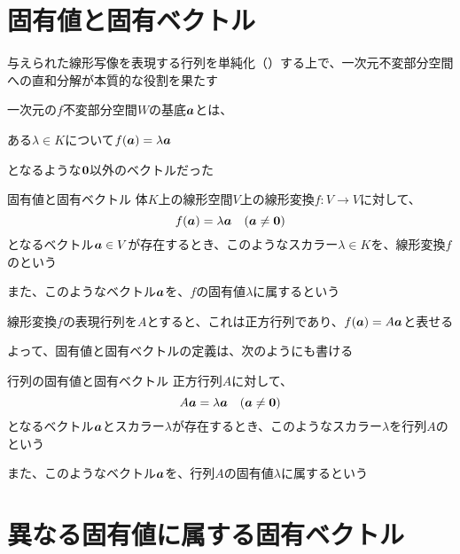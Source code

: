 \documentclass[../../../topic_linear-algebra]{subfiles}
\begin{document}
\sectionline
\section{固有値と固有ベクトル}

与えられた線形写像を表現する行列を単純化（）する上で、一次元不変部分空間への直和分解が本質的な役割を果たす

\br

一次元の$f$不変部分空間$W$の基底$\vb*{a}$とは、
\begin{shaded}
  ある$\lambda \in K$について$f(\vb*{a}) = \lambda \vb*{a}$
\end{shaded}
となるような$\vb*{0}$以外のベクトルだった

\begin{definition}{固有値と固有ベクトル}
  体$K$上の線形空間$V$上の線形変換$f\colon V \to V$に対して、
  \begin{equation*}
    f(\vb*{a}) = \lambda \vb*{a} \quad (\vb*{a} \neq \vb*{0})
  \end{equation*}
  となるベクトル$\vb*{a} \in V$が存在するとき、このようなスカラー$\lambda \in K$を、線形変換$f$のという

  また、このようなベクトル$\vb*{a}$を、$f$の固有値$\lambda$に属するという
\end{definition}

線形変換$f$の表現行列を$A$とすると、これは正方行列であり、$f(\vb*{a}) = A\vb*{a}$と表せる

よって、固有値と固有ベクトルの定義は、次のようにも書ける

\begin{definition}{行列の固有値と固有ベクトル}
  正方行列$A$に対して、
  \begin{equation*}
    A\vb*{a} = \lambda \vb*{a} \quad (\vb*{a} \neq \vb*{0})
  \end{equation*}
  となるベクトル$\vb*{a}$とスカラー$\lambda$が存在するとき、このようなスカラー$\lambda$を行列$A$のという

  また、このようなベクトル$\vb*{a}$を、行列$A$の固有値$\lambda$に属するという
\end{definition}

\sectionline
\section{異なる固有値に属する固有ベクトル}
\end{document}
